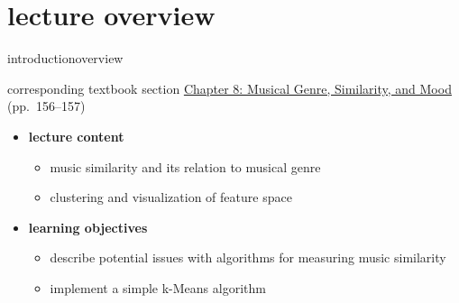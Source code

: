 




\subtitle{Module 8.2: Music Similarity}


	

    \section[overview]{lecture overview}
        \begin{frame}{introduction}{overview}
            \begin{block}{corresponding textbook section}
                    \href{http://ieeexplore.ieee.org/xpl/articleDetails.jsp?arnumber=6331125}{Chapter 8: Musical Genre, Similarity, and Mood} (pp.~156--157)
            \end{block}

            \begin{itemize}
                \item   \textbf{lecture content}
                    \begin{itemize}
                        \item   music similarity and its relation to musical genre
                        \item   clustering and visualization of feature space
                    \end{itemize}
                \bigskip
                \item<2->   \textbf{learning objectives}
                    \begin{itemize}
                        \item   describe potential issues with algorithms for measuring music similarity
                        \item   implement a simple k-Means algorithm
                    \end{itemize}
            \end{itemize}
        \end{frame}

